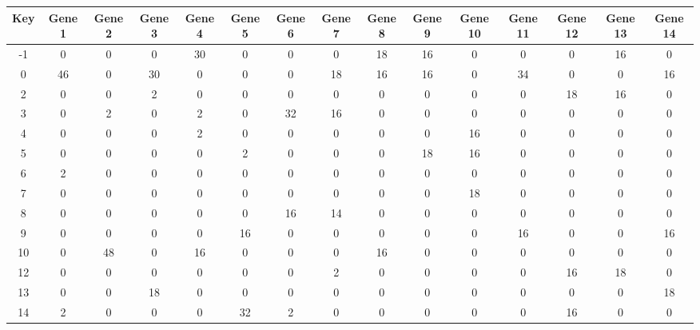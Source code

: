 \begin{tabular}{|c|c|c|c|c|c|c|c|c|c|c|c|c|c|c|}
\hline
Key & Gene 1 & Gene 2 & Gene 3 & Gene 4 & Gene 5 & Gene 6 & Gene 7 & Gene 8 & Gene 9 & Gene 10 & Gene 11 & Gene 12 & Gene 13 & Gene 14 \\
\hline
-1 & 0 & 0 & 0 & 30 & 0 & 0 & 0 & 18 & 16 & 0 & 0 & 0 & 16 & 0 \\
0 & 46 & 0 & 30 & 0 & 0 & 0 & 18 & 16 & 16 & 0 & 34 & 0 & 0 & 16 \\
2 & 0 & 0 & 2 & 0 & 0 & 0 & 0 & 0 & 0 & 0 & 0 & 18 & 16 & 0 \\
3 & 0 & 2 & 0 & 2 & 0 & 32 & 16 & 0 & 0 & 0 & 0 & 0 & 0 & 0 \\
4 & 0 & 0 & 0 & 2 & 0 & 0 & 0 & 0 & 0 & 16 & 0 & 0 & 0 & 0 \\
5 & 0 & 0 & 0 & 0 & 2 & 0 & 0 & 0 & 18 & 16 & 0 & 0 & 0 & 0 \\
6 & 2 & 0 & 0 & 0 & 0 & 0 & 0 & 0 & 0 & 0 & 0 & 0 & 0 & 0 \\
7 & 0 & 0 & 0 & 0 & 0 & 0 & 0 & 0 & 0 & 18 & 0 & 0 & 0 & 0 \\
8 & 0 & 0 & 0 & 0 & 0 & 16 & 14 & 0 & 0 & 0 & 0 & 0 & 0 & 0 \\
9 & 0 & 0 & 0 & 0 & 16 & 0 & 0 & 0 & 0 & 0 & 16 & 0 & 0 & 16 \\
10 & 0 & 48 & 0 & 16 & 0 & 0 & 0 & 16 & 0 & 0 & 0 & 0 & 0 & 0 \\
12 & 0 & 0 & 0 & 0 & 0 & 0 & 2 & 0 & 0 & 0 & 0 & 16 & 18 & 0 \\
13 & 0 & 0 & 18 & 0 & 0 & 0 & 0 & 0 & 0 & 0 & 0 & 0 & 0 & 18 \\
14 & 2 & 0 & 0 & 0 & 32 & 2 & 0 & 0 & 0 & 0 & 0 & 16 & 0 & 0 \\
\hline
\end{tabular}